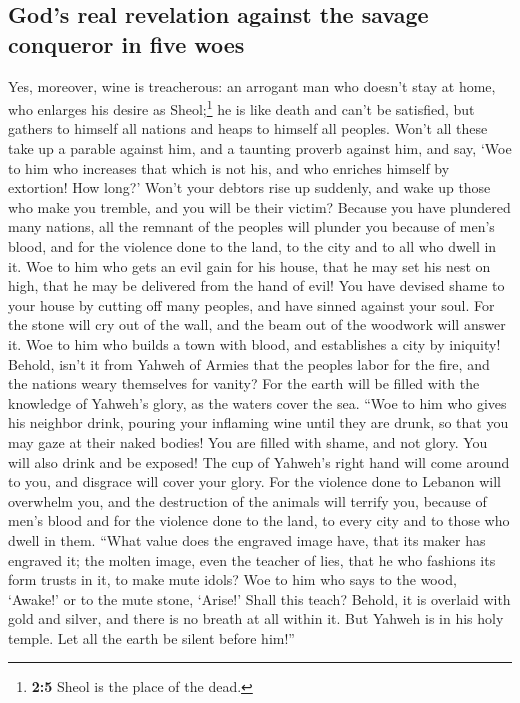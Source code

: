 \hypertarget{gods-real-revelation-against-the-savage-conqueror-in-five-woes}{%
\subsection{God's real revelation against the savage conqueror in five
woes}\label{gods-real-revelation-against-the-savage-conqueror-in-five-woes}}

 Yes, moreover, wine is treacherous: an arrogant man who
doesn't stay at home, who enlarges his desire as Sheol;\footnote{\textbf{2:5}
  Sheol is the place of the dead.} he is like death and can't be
satisfied, but gathers to himself all nations and heaps to himself all
peoples.  Won't all these take up a parable against him,
and a taunting proverb against him, and say, `Woe to him who increases
that which is not his, and who enriches himself by extortion! How long?'
 Won't your debtors rise up suddenly, and wake up those
who make you tremble, and you will be their victim? 
Because you have plundered many nations, all the remnant of the peoples
will plunder you because of men's blood, and for the violence done to
the land, to the city and to all who dwell in it.  Woe to
him who gets an evil gain for his house, that he may set his nest on
high, that he may be delivered from the hand of evil! 
You have devised shame to your house by cutting off many peoples, and
have sinned against your soul.  For the stone will cry
out of the wall, and the beam out of the woodwork will answer it.
 Woe to him who builds a town with blood, and establishes
a city by iniquity!  Behold, isn't it from Yahweh of
Armies that the peoples labor for the fire, and the nations weary
themselves for vanity?  For the earth will be filled with
the knowledge of Yahweh's glory, as the waters cover the sea.
 ``Woe to him who gives his neighbor drink, pouring your
inflaming wine until they are drunk, so that you may gaze at their naked
bodies!  You are filled with shame, and not glory. You
will also drink and be exposed! The cup of Yahweh's right hand will come
around to you, and disgrace will cover your glory.  For
the violence done to Lebanon will overwhelm you, and the destruction of
the animals will terrify you, because of men's blood and for the
violence done to the land, to every city and to those who dwell in them.
 ``What value does the engraved image have, that its
maker has engraved it; the molten image, even the teacher of lies, that
he who fashions its form trusts in it, to make mute idols?
 Woe to him who says to the wood, `Awake!' or to the mute
stone, `Arise!' Shall this teach? Behold, it is overlaid with gold and
silver, and there is no breath at all within it.  But
Yahweh is in his holy temple. Let all the earth be silent before him!''

